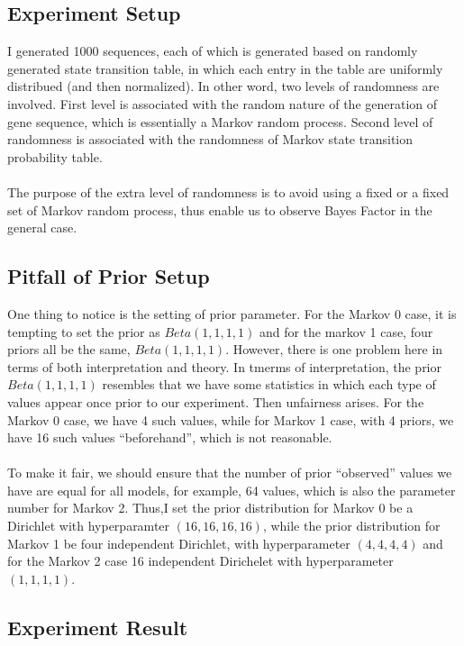 \documentclass[paper=a4, fontsize=11pt]{scrartcl} %
\numberwithin{equation}{section} %
\numberwithin{figure}{section} %
\numberwithin{table}{section} %
\begin{document}
\subsection {Experiment Setup}

I generated 1000 sequences, each of which is generated based on randomly generated state transition table, in which each entry in the table are uniformly distribued (and then normalized). In other word, two levels of randomness are involved. First level is associated with the random nature of the generation of gene sequence, which is essentially a Markov random process. Second level of randomness is associated with the randomness of Markov state transition probability table. 
\\\\ 
The purpose of the extra level of randomness is to avoid using a fixed or a fixed set of Markov random process, thus enable us to observe Bayes Factor in the general case.

\subsection {Pitfall of Prior Setup}
One thing to notice is the setting of prior parameter. For the Markov 0 case, it is tempting to set the prior as $Beta (1, 1, 1, 1)$ and for the markov 1 case, four priors all be the same, $Beta (1, 1, 1, 1)$. However, there is one problem here in terms of both interpretation and theory. In tmerms of interpretation, the prior $Beta (1,1,1,1)$  resembles that we have some statistics in which each type of values appear once prior to our experiment. Then unfairness arises. For the Markov 0 case, we have 4 such values, while for Markov 1 case, with 4 priors, we have 16 such values ``beforehand'', which is not reasonable. 
\\\\
To make it fair, we should ensure that the number of prior ``observed'' values we have are equal for all models, for example, 64 values, which is also the parameter number for Markov 2. Thus,I set the prior distribution for Markov 0 be a Dirichlet with hyperparamter $(16, 16, 16, 16)$, while the prior distribution for Markov 1 be four independent Dirichlet, with hyperparameter $(4,4,4,4)$ and for the Markov 2 case 16 independent Dirichelet with hyperparameter $(1,1,1,1)$.


\subsection {Experiment Result}
\end{document}
